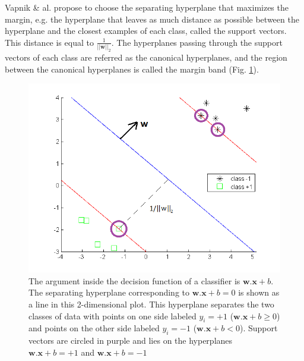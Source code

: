 \noindent Vapnik \& al. \cite{Cortes1995} propose to choose the separating hyperplane that maximizes the margin, e.g. the hyperplane that leaves as much distance as possible between the hyperplane and the closest examples of each class, called the support vectors. This distance is equal to $\frac{1}{||\textbf{w}||_2}$. The hyperplanes passing through the support vectors of each class are referred as the canonical hyperplanes, and the region between the canonical hyperplanes is called the margin band (Fig. \ref{fig:Separatrice_lineaire_avec_marges}).

\begin{figure}
\centering
\includegraphics[width=0.6\linewidth]{images/Separatrice_lineaire_avec_marges2}
\caption{The argument inside the decision function of a classifier is $\textbf{w}.\textbf{x} + b$. The separating hyperplane corresponding to $\textbf{w}.\textbf{x} + b = 0$ is shown as a line in this 2-dimensional plot. This hyperplane separates the two classes of data with points on one side labeled $y_i = +1$ ($\textbf{w}.\textbf{x} + b \geq 0$) and points on the other side labeled $y_i=-1$ ($\textbf{w}.\textbf{x} + b < 0$). Support vectors are circled in purple and lies on the hyperplanes $\textbf{w}.\textbf{x} + b = +1$ and $\textbf{w}.\textbf{x} + b = -1$}
\label{fig:Separatrice_lineaire_avec_marges}
\end{figure}





